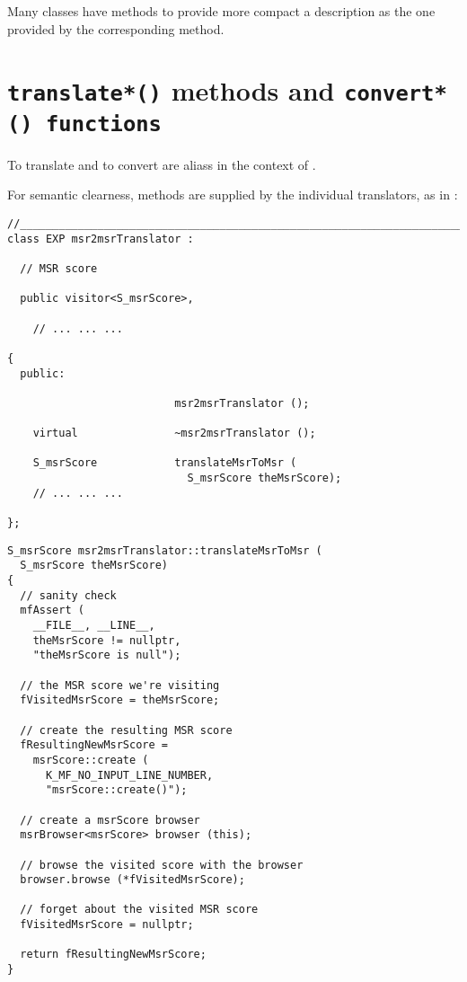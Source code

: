 Many classes have  methods to provide more compact a description as the one provided by the corresponding  method.%


\section{{\tt translate*()} methods and {\tt convert*() functions}}

To translate and to convert are aliass in the context of \mf.

For semantic clearness,  methods are supplied by the individual translators, as in :
\begin{lstlisting}[language=CPlusPlus]
//________________________________________________________________________
class EXP msr2msrTranslator :

  // MSR score

  public visitor<S_msrScore>,

	// ... ... ...

{
  public:

                          msr2msrTranslator ();

    virtual               ~msr2msrTranslator ();

    S_msrScore            translateMsrToMsr (
                            S_msrScore theMsrScore);
	// ... ... ...

};
\end{lstlisting}

\begin{lstlisting}[language=CPlusPlus]
S_msrScore msr2msrTranslator::translateMsrToMsr (
  S_msrScore theMsrScore)
{
  // sanity check
  mfAssert (
    __FILE__, __LINE__,
    theMsrScore != nullptr,
    "theMsrScore is null");

  // the MSR score we're visiting
  fVisitedMsrScore = theMsrScore;

  // create the resulting MSR score
  fResultingNewMsrScore =
    msrScore::create (
      K_MF_NO_INPUT_LINE_NUMBER,
      "msrScore::create()");

  // create a msrScore browser
  msrBrowser<msrScore> browser (this);

  // browse the visited score with the browser
  browser.browse (*fVisitedMsrScore);

  // forget about the visited MSR score
  fVisitedMsrScore = nullptr;

  return fResultingNewMsrScore;
}
\end{lstlisting}

